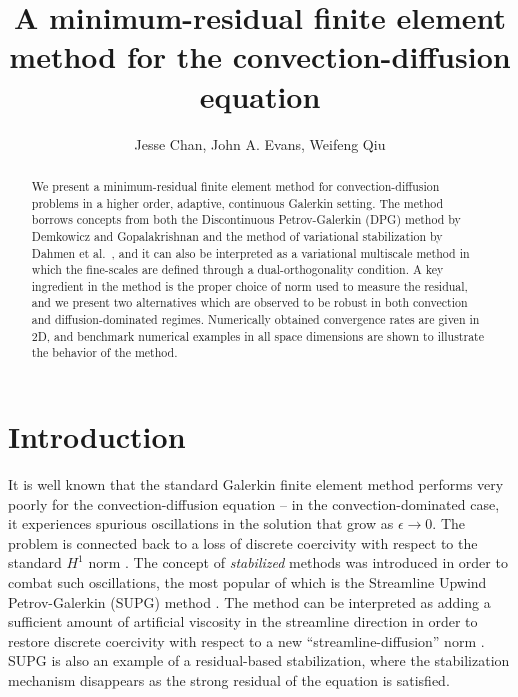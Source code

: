 \documentclass[final,leqno]{siamltex}
\title{A minimum-residual finite element method for the convection-diffusion equation}
\author{Jesse Chan, John A. Evans, Weifeng Qiu}
\date{}
\begin{document}
\maketitle

\begin{abstract}
We present a minimum-residual finite element method for convection-diffusion problems in a higher order, adaptive, continuous Galerkin setting.  The method borrows concepts from both the Discontinuous Petrov-Galerkin (DPG) method by Demkowicz and Gopalakrishnan \cite{DPG2} and the method of variational stabilization by Dahmen et al.\ \cite{DahmenVariationalStabilization}, and it can also be interpreted as a variational multiscale method in which the fine-scales are defined through a dual-orthogonality condition.  A key ingredient in the method is the proper choice of norm used to measure the residual, and we present two alternatives which are observed to be robust in both convection and diffusion-dominated regimes.  Numerically obtained convergence rates are given in 2D, and benchmark numerical examples in all space dimensions are shown to illustrate the behavior of the method.
\end{abstract}


\section{Introduction}

It is well known that the standard Galerkin finite element method performs very poorly for the convection-diffusion equation -- in the convection-dominated case, it experiences spurious oscillations in the solution that grow as $\epsilon \rightarrow 0$.  The problem is connected back to a loss of discrete coercivity with respect to the standard $H^1$ norm \cite{roos2008robust}.  The concept of \textit{stabilized} methods was introduced in order to combat such oscillations, the most popular of which is the Streamline Upwind Petrov-Galerkin (SUPG) method \cite{SUPG}.  The method can be interpreted as adding a sufficient amount of artificial viscosity in the streamline direction in order to restore discrete coercivity with respect to a new ``streamline-diffusion'' norm \cite{johnsonCrosswind}.  SUPG is also an example of a residual-based stabilization, where the stabilization mechanism disappears as the strong residual of the equation is satisfied.  
\end{document}
